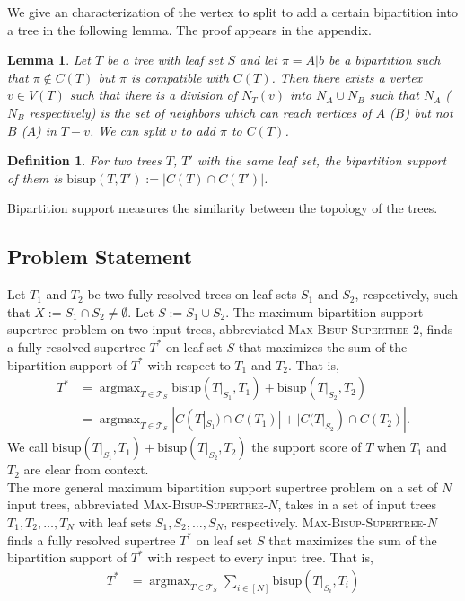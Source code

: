 \documentclass{bmcart}
\newcommand{\bs}{\mathrm{bisup}}
\DeclareMathOperator*{\argmax}{argmax}
\newtheorem{lemma}{Lemma}
\newtheorem{definition}{Definition}
\begin{document}
We give an characterization of the vertex to split to add a certain bipartition into a tree in the following lemma. The proof appears in the appendix. 
\begin{lemma} \label{lem:vertex_to_split}
    Let $T$ be a tree with leaf set $S$ and let $\pi = A|b$ be a bipartition such that $\pi \notin C(T)$ but $\pi$ is compatible with $C(T)$. Then there exists a vertex $v \in V(T)$ such that there is a division of $N_T(v)$ into $N_A \cup N_B$ such that $N_A$ ($N_B$ respectively) is the set of neighbors which can reach vertices of $A$ ($B$) but not $B$ ($A$) in $T-v$. We can split $v$ to add $\pi$ to $C(T)$.
\end{lemma}



\begin{definition}
For two trees $T$, $T'$ with the same leaf set, the \textit{bipartition support} of them is $\bs(T, T') := |C(T) \cap C(T')|$.
\end{definition}

Bipartition support measures the similarity between the topology of the trees.

\subsection{Problem Statement}
Let $T_1$ and $T_2$ be two fully resolved trees on leaf sets $S_1$ and $S_2$, respectively, such that $X := S_1 \cap S_2 \neq \emptyset$. Let $S := S_1 \cup S_2$. The maximum bipartition support supertree problem on two input trees, abbreviated \textsc{Max-Bisup-Supertree-$2$}, finds a fully resolved supertree $T^*$ on leaf set $S$ that maximizes the sum of the bipartition support of $T^*$ with respect to $T_1$ and $T_2$. That is, 
\begin{align*}
    T^* &= \argmax_{T \in \mathcal{T}_S} \bs(T|_{S_1}, T_1) + \bs(T|_{S_2}, T_2)\\ 
        &= \argmax_{T \in \mathcal{T}_S} |C(T|_{S_1})\cap C(T_1)| + |C(T|_{S_2}) \cap C(T_2)|.
\end{align*}
We call $\bs(T|_{S_1}, T_1) + \bs(T|_{S_2}, T_2)$ the support score of $T$ when $T_1$ and $T_2$ are clear from context.\\

The more general maximum bipartition support supertree problem on a set of $N$ input trees, abbreviated \textsc{Max-Bisup-Supertree-$N$}, takes in a set of input trees $T_1,T_2,\dots,T_N$ with leaf sets $S_1,S_2,\dots,S_N$, respectively. \textsc{Max-Bisup-Supertree-$N$} finds a fully resolved supertree $T^*$ on leaf set $S$ that maximizes the sum of the bipartition support of $T^*$ with respect to every input tree. That is,
\begin{align*}
    T^* &= \argmax_{T \in \mathcal{T}_S} \sum_{i \in [N]} \bs(T|_{S_i}, T_i) \\ 
\end{align*}
\end{document}
